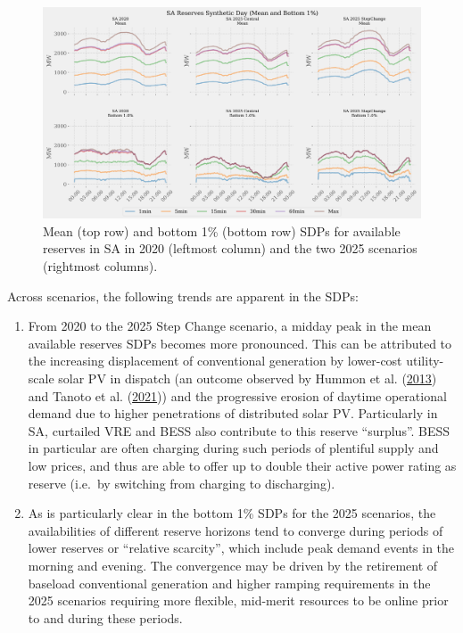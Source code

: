 \documentclass[12pt,a4paper,]{report}
\providecommand{\tightlist}{%
  \setlength{\itemsep}{0pt}\setlength{\parskip}{0pt}}
\begin{document}
\begin{figure}
\hypertarget{fig:sareserves}{%
\centering
\includegraphics[width=1\textwidth,height=\textheight]{./source/figures/SA_reserves_all_profiles_by_di.png}
\caption[SA available reserves SDPs]{Mean (top row) and bottom 1\%
(bottom row) SDPs for available reserves in SA in 2020 (leftmost column)
and the two 2025 scenarios (rightmost columns).}\label{fig:sareserves}
}
\end{figure}

Across scenarios, the following trends are apparent in the SDPs:

\begin{enumerate}
\def\labelenumi{\arabic{enumi}.}
\tightlist
\item
  From 2020 to the 2025 Step Change scenario, a midday peak in the mean
  available reserves SDPs becomes more pronounced. This can be
  attributed to the increasing displacement of conventional generation
  by lower-cost utility-scale solar PV in dispatch (an outcome observed
  by Hummon et al.
  (\protect\hyperlink{ref-hummonFundamentalDriversCost2013}{2013}) and
  Tanoto et al.
  (\protect\hyperlink{ref-tanotoImpactHighSolar2021}{2021})) and the
  progressive erosion of daytime operational demand due to higher
  penetrations of distributed solar PV. Particularly in SA, curtailed
  VRE and BESS also contribute to this reserve ``surplus''. BESS in
  particular are often charging during such periods of plentiful supply
  and low prices, and thus are able to offer up to double their active
  power rating as reserve (i.e.~by switching from charging to
  discharging).
\item
  As is particularly clear in the bottom 1\% SDPs for the 2025
  scenarios, the availabilities of different reserve horizons tend to
  converge during periods of lower reserves or ``relative scarcity'',
  which include peak demand events in the morning and evening. The
  convergence may be driven by the retirement of baseload conventional
  generation and higher ramping requirements in the 2025 scenarios
  requiring more flexible, mid-merit resources to be online prior to and
  during these periods.
\end{enumerate}
\end{document}
